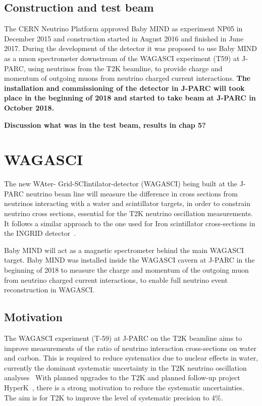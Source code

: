 \subsection{Construction and test beam}

The CERN Neutrino Platform approved Baby MIND as experiment NP05 in December 2015 and construction started in August 2016 and finished in June 2017. During the development of the detector it was proposed to use Baby MIND as a muon spectrometer downstream of the WAGASCI experiment (T59) at J-PARC, using neutrinos from the T2K beamline, to provide charge and momentum of outgoing muons from neutrino charged current interactions. \textbf{The installation and commissioning of the detector in J-PARC will took place in the beginning of 2018 and started to take beam at J-PARC in October 2018.}

\textbf{Discussion what was in the test beam, results in chap 5?}

\newpage

\section{WAGASCI}\label{sec:WAGASCI}

The new WAter- Grid-SCIintilator-detector (WAGASCI) being built at the J-PARC neutrino beam line will measure the difference in cross sections from neutrinos interacting with a water and scintillator targets, in order to constrain neutrino cross sections, essential for the T2K neutrino oscillation measurements. It follows a similar approach to the one used for Iron scintillator cross-sections in the INGRID detector~\cite{21T2K}.

Baby MIND will act as a magnetic spectrometer behind the main WAGASCI target. Baby MIND was installed inside the WAGASCI cavern at J-PARC in the beginning of 2018 to measure the charge and momentum of the outgoing muon from neutrino charged current interactions, to enable full neutrino event reconstruction in WAGASCI.

\subsection{Motivation}
The WAGASCI experiment (T-59) at J-PARC on the T2K beamline aims to improve measurements of the ratio of neutrino interaction cross-sections on water and carbon. This is required to reduce systematics due to nuclear effects in water, currently the dominant systematic uncertainty in the T2K neutrino oscillation analyses~\cite{21T2K} With planned upgrades to the T2K and planned follow-up project HyperK~\cite{24HyperK}, there is a strong motivation to reduce the systematic uncertainties. The aim is for T2K to improve the level of systematic precision to 4\%. 

